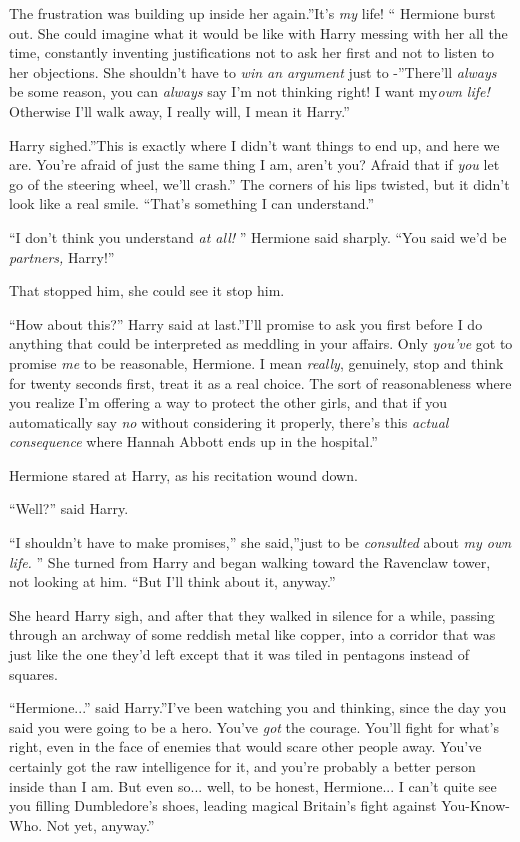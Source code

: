 The frustration was building up inside her again.''It's \emph{my} life!
`` Hermione burst out. She could imagine what it would be like with Harry
messing with her all the time, constantly inventing justifications not
to ask her first and not to listen to her objections. She shouldn't have
to \emph{win an argument} just to -''There'll \emph{always} be some
reason, you can \emph{always} say I'm not thinking right! I want
my\emph{own life!} Otherwise I'll walk away, I really will, I mean it
Harry.''

Harry sighed.''This is exactly where I didn't want things to end up, and
here we are. You're afraid of just the same thing I am, aren't you?
Afraid that if \emph{you} let go of the steering wheel, we'll crash.''
The corners of his lips twisted, but it didn't look like a real smile.
``That's something I can understand.''

``I don't think you understand \emph{at all!} '' Hermione said sharply.
``You said we'd be \emph{partners,} Harry!''

That stopped him, she could see it stop him.

``How about this?'' Harry said at last.''I'll promise to ask you first
before I do anything that could be interpreted as meddling in your
affairs. Only \emph{you've} got to promise \emph{me} to be reasonable,
Hermione. I mean \emph{really}, genuinely, stop and think for twenty
seconds first, treat it as a real choice. The sort of reasonableness
where you realize I'm offering a way to protect the other girls, and
that if you automatically say \emph{no} without considering it properly,
there's this \emph{actual consequence} where Hannah Abbott ends up in
the hospital.''

Hermione stared at Harry, as his recitation wound down.

``Well?'' said Harry.

``I shouldn't have to make promises,'' she said,''just to be
\emph{consulted} about \emph{my own life.} '' She turned from Harry and
began walking toward the Ravenclaw tower, not looking at him. ``But I'll
think about it, anyway.''

She heard Harry sigh, and after that they walked in silence for a while,
passing through an archway of some reddish metal like copper, into a
corridor that was just like the one they'd left except that it was tiled
in pentagons instead of squares.

``Hermione...'' said Harry.''I've been watching you and thinking,
since the day you said you were going to be a hero. You've \emph{got}
the courage. You'll fight for what's right, even in the face of enemies
that would scare other people away. You've certainly got the raw
intelligence for it, and you're probably a better person inside than I
am. But even so... well, to be honest, Hermione... I can't
quite see you filling Dumbledore's shoes, leading magical Britain's
fight against You-Know-Who. Not yet, anyway.''

